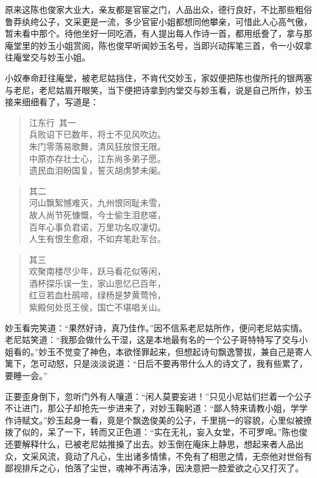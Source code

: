 \documentclass[12pt,oneside]{book}
\newenvironment{shici}{%
\begin{verse}%
\centering\large\hspace{12pt}}%
{\end{verse}}
\begin{document}
原来这陈也俊家大业大，亲友都是官宦之门，人品出众，德行良好，不比那些粗俗鲁莽纨绔公子，文采更是一流，多少官宦小姐都想同他攀亲，可惜此人心高气傲，暂未看中那个。待他坐好一同吃酒，有人提出每人作诗一首，都用纸誊了，拿与那庵堂里的妙玉小姐赏阅，陈也俊早听闻妙玉名号，当即兴动挥笔三首，令一小奴拿往庵堂交与妙玉小姐。

小奴奉命赶往庵堂，被老尼姑挡住，不肯代交妙玉，家奴便把陈也俊所托的银两塞与老尼，老尼姑眉开眼笑，当下便把诗拿到内堂交与妙玉看，说是自己所作，妙玉接来细细看了，写道是：

\begin{shici}
江东行~其一\\
兵败诏下已数年，将士不见风吹边。\\
朱门零落易歌舞，清风狂放恨无限。\\
中原亦存壮士心，江东尚多弟子愿。\\
遗民血泪盼国复，誓灭胡虏梦未阑。
\end{shici}

\begin{shici}
其二\\
河山飘絮憾难灭，九州恨同耻未雪，\\
故人尚节死慷慨，今士偷生泪悲嗟，\\
百年心事负君诺，万里功名叹凄切。\\
人生有恨生愈艰，不如弃笔赴军台。
\end{shici}

\begin{shici}
其三\\
欢聚南楼尽少年，跃马看花似等闲，\\
酒杯探乐误一生，家山思忆已百年，\\
红豆若血杜鹃啼，绿杨是梦黄莺怜，\\
紫殿何处觅王侯，国亡不堪唱关山。
\end{shici}

妙玉看完笑道：“果然好诗，真乃佳作。”因不信系老尼姑所作，便问老尼姑实情。老尼姑笑道：“我那会做什么干湿，这是本地最有名的一个公子哥特特写了交与小姐看的。”妙玉不觉变了神色，本欲怪罪起来，但想起诗句飘逸警拔，兼自己是寄人篱下，怎可动怒，只是淡淡说道：“日后不要再带什么人的诗文了，我有些累了，要睡一会。”

正要歪身倒下，忽听门外有人嚷道：“闲人莫要妄进！”只见小尼姑们拦着一个公子不让进门，那公子却抢先一步进来了，对妙玉鞠躬道：“鄙人特来请教小姐，学学作诗赋文。”妙玉起身一看，竟是个飘逸俊美的公子，千里挑一的容貌，心里似被撩拨了似的，呆了一下，转而又正色道：“实在无礼，妄入女堂，不可罗唣。”陈也俊还要解释什么，已被老尼姑推搡了出去。妙玉倒在庵床上静思，想起来者人品出众，文采风流，竟动了凡心，生出诸多情愫，不免有了相思之情，无奈他对世俗有鄙视排斥之心，怕落了尘世，魂神不再洁净，因决意把一腔爱欲之心又打灭了。
\end{document}
